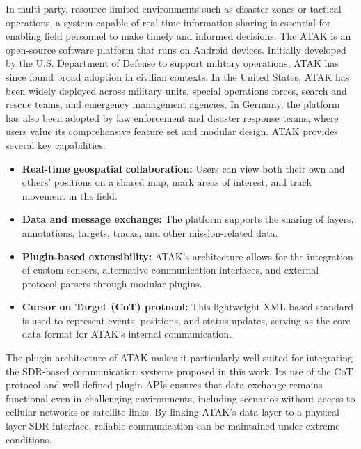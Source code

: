 In multi-party, resource-limited environments such as disaster zones or tactical operations, a system capable of real-time information sharing is essential for enabling field personnel to make timely and informed decisions. The ATAK is an open-source software platform that runs on Android devices. Initially developed by the U.S. Department of Defense to support military operations, ATAK has since found broad adoption in civilian contexts.
In the United States, ATAK has been widely deployed across military units, special operations forces, search and rescue teams, and emergency management agencies. In Germany, the platform has also been adopted by law enforcement and disaster response teams, where users value its comprehensive feature set and modular design.
ATAK provides several key capabilities:
\begin{itemize}
    \item\textbf{Real-time geospatial collaboration:} Users can view both their own and others' positions on a shared map, mark areas of interest, and track movement in the field.

    \item\textbf{Data and message exchange:} The platform supports the sharing of layers, annotations, targets, tracks, and other mission-related data.

    \item\textbf{Plugin-based extensibility:} ATAK’s architecture allows for the integration of custom sensors, alternative communication interfaces, and external protocol parsers through modular plugins.
    
    \item\textbf{Cursor on Target (CoT) protocol:} This lightweight XML-based standard is used to represent events, positions, and status updates, serving as the core data format for ATAK’s internal communication.
\end{itemize}
 
The plugin architecture of ATAK makes it particularly well-suited for integrating the SDR-based communication systems proposed in this work. Its use of the CoT protocol and well-defined plugin APIs ensures that data exchange remains functional even in challenging environments, including scenarios without access to cellular networks or satellite links. By linking ATAK’s data layer to a physical-layer SDR interface, reliable communication can be maintained under extreme conditions.
